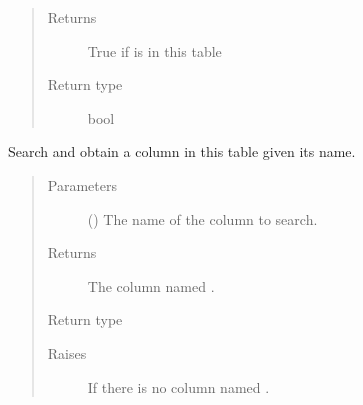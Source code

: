 \documentclass[letterpaper,10pt,english]{sphinxmanual}
\begin{document}
\begin{fulllineitems}
\begin{fulllineitems}
\begin{quote}
\begin{description}
\item[{Returns}] \leavevmode
\sphinxAtStartPar
True if  is in this table

\item[{Return type}] \leavevmode
\sphinxAtStartPar
bool

\end{description}\end{quote}

\end{fulllineitems}


\begin{fulllineitems}
\label{\detokenize{model:simple_sql.model.table.Table.get_column}}
\sphinxAtStartPar
Search and obtain a column in this table given its name.
\begin{quote}\begin{description}
\item[{Parameters}] \leavevmode
\sphinxAtStartPar
{} () \textendash{} The name of the column to search.

\item[{Returns}] \leavevmode
\sphinxAtStartPar
The column named .

\item[{Return type}] \leavevmode
\sphinxAtStartPar
{\hyperref[\detokenize{model:simple_sql.model.column.Column}]{}}

\item[{Raises}] \leavevmode
\sphinxAtStartPar
{} \textendash{} If there is no column named .

\end{description}\end{quote}

\end{fulllineitems}



\end{fulllineitems}
\end{document}
